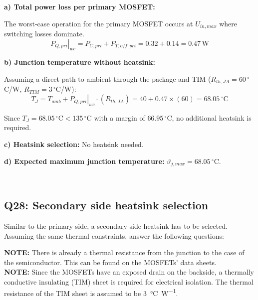 \documentclass{PELsmallreport}
\begin{document}
\begin{framed}
	\vspace{2em}
  \textbf{a) Total power loss per primary MOSFET:}
 
The worst-case operation for the primary MOSFET occurs at $U_{in,max}$ where switching losses dominate.
\begin{equation}
    \left.P_{Q,pri}\right|_{wc} = P_{C,pri} + P_{T,off,pri} = 0.32 + 0.14 = 0.47\,\text{W}
\end{equation}
 
\textbf{b) Junction temperature without heatsink:}
 
Assuming a direct path to ambient through the package and TIM ($R_{th,JA} = 60\,^\circ$C/W, $R_{TIM} = 3\,^\circ$C/W):
\begin{equation}
    T_J = T_{amb} + \left.P_{Q,pri}\right|_{wc}\cdot(R_{th,JA})
    = 40 + 0.47\times(60) = 68.05\,^\circ\text{C}
\end{equation}
 
Since $T_J = 68.05\,^\circ\text{C} < 135\,^\circ\text{C}$ with a margin of $66.95\,^\circ$C, no additional heatsink is required.
 
\textbf{c) Heatsink selection:} No heatsink needed.
 
\textbf{d) Expected maximum junction temperature:} $\vartheta_{j,max} = 68.05\,^\circ$C.
	\vspace{1em}
  \vspace{2em}
\end{framed}

 \quad {} \\


\quad {}
\hfill{}

\vspace{1em}
\subsection{Q28: Secondary side heatsink selection} Similar to the primary side, a secondary side heatsink has to be selected. Assuming the same thermal constraints, answer the following questions:

\textbf{NOTE:} There is already a thermal resistance from the junction to the case of the semiconductor. This can be found on the MOSFETs' data sheets.\\
\textbf{NOTE:} Since the MOSFETs have an exposed drain on the backside, a thermally conductive insulating (TIM) sheet is required for electrical isolation. The thermal resistance of the TIM sheet is assumed to be \SI{3}{\degreeCelsius\per\watt}.\\
\end{document}
